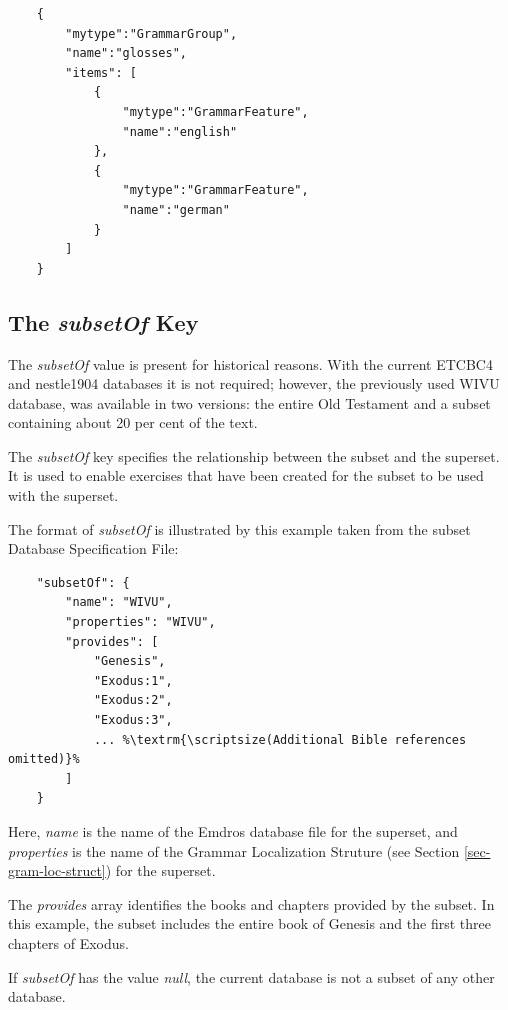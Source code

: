 \documentclass[11pt,oneside,a4paper]{memoir}
\begin{document}
\begin{lstlisting}
    {
        "mytype":"GrammarGroup",
        "name":"glosses",
        "items": [
            {
                "mytype":"GrammarFeature",
                "name":"english"
            },
            {
                "mytype":"GrammarFeature",
                "name":"german"
            }
        ]
    }
\end{lstlisting}


\subsection{The \emph{subsetOf} Key}\label{subsetof}

The \emph{subsetOf} value is present for historical reasons. With the current ETCBC4 and nestle1904
databases it is not required; however, the previously used WIVU database, was available in two
versions: the entire Old Testament and a subset containing about 20 per cent of the text.

The \emph{subsetOf} key specifies the relationship between the subset and the superset. It is used
to enable exercises that have been created for the subset to be used with the superset.

The format of \emph{subsetOf} is illustrated by this example taken from the subset Database
Specification File:

\begin{lstlisting}
    "subsetOf": {
        "name": "WIVU",
        "properties": "WIVU",
        "provides": [
            "Genesis",
            "Exodus:1",
            "Exodus:2",
            "Exodus:3",
            ... %\textrm{\scriptsize(Additional Bible references omitted)}%
        ]
    }
\end{lstlisting}

Here, \emph{name} is the name of the Emdros database file for the superset, and \emph{properties} is
the name of the Grammar Localization Struture (see
Section \ref{sec-gram-loc-struct}) for the superset.

The \emph{provides} array identifies the books and chapters provided by the subset. In this example,
the subset includes the entire book of Genesis and the first three chapters of Exodus.

If \emph{subsetOf} has the value \emph{null}, the current database is not a subset of any other
database.
\end{document}
